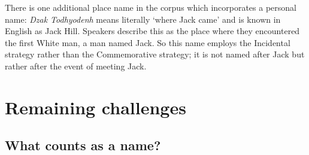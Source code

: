 There is one additional place name in the corpus which incorporates a personal name: \textit{Dzak Todhyodenh} means literally ‘where Jack came’ and is known in English as Jack Hill. Speakers describe this as the place where they encountered the first White man, a man named Jack. So this name employs the Incidental strategy rather than the Commemorative strategy; it is not named after Jack but rather after the event of meeting Jack.

\section{Remaining challenges}


\subsection{What counts as a name?}

